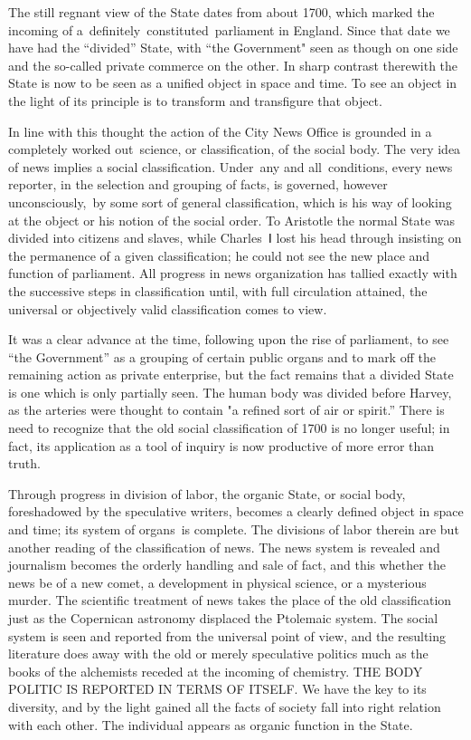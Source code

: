 \documentclass[openany,nobib]{tufte-book}
\begin{document}
The still regnant view of the State dates from about 1700, which marked
the incoming of a~definitely~constituted~parliament in England. Since
that date we have had the ``divided'' State, with ``the Government" seen
as though on one side and the so-called private commerce on the other.
In sharp contrast therewith the State is now to be seen as a unified
object in space and time. To see an object in the light of its principle
is to transform and transfigure that object.~~

In line with this thought the action of the City News Office is grounded
in a completely worked out~science, or classification, of the social
body. The very idea of news implies a social classification. Under~any
and all~conditions, every news reporter, in the selection and grouping
of facts, is governed, however unconsciously,~by some sort of general
classification, which is his way of looking at the object or his notion
of the social order. To Aristotle the normal State was divided into
citizens and slaves, while Charles~Ⅰ lost his head through insisting on
the permanence of a given classification; he could not see the new place
and function of parliament. All progress in news organization has
tallied exactly with the successive steps in classification until, with
full circulation attained, the universal or objectively valid
classification comes to view.~

It was a clear advance at the time, following upon the rise of
parliament, to see ``the Government'' as a grouping of certain public
organs and to mark off the remaining action as private enterprise, but
the fact remains that a divided State is one which is only partially
seen. The human body was divided before Harvey, as the arteries were
thought to contain "a refined sort of air or spirit.'' There is need to
recognize that the old social classification of 1700 is no longer
useful; in fact, its application as a tool of inquiry is now productive
of more error than truth.~

Through progress in division of labor, the organic State, or social
body, foreshadowed by the speculative writers, becomes a clearly defined
object in space and time; its system of organs~is complete. The
divisions of labor therein are but another reading of the classification
of news. The news system is revealed and journalism becomes the orderly
handling and sale of fact, and this whether the news be of a new comet,
a development in physical science, or a mysterious murder. The
scientific treatment of news takes the place of the old classification
just as the Copernican astronomy displaced the Ptolemaic system. The
social system is seen and reported from the universal point of view, and
the resulting literature does away with the old or merely speculative
politics much as the books of the alchemists receded at the incoming of
chemistry. THE BODY POLITIC IS REPORTED IN TERMS OF ITSELF. We have the
key to its diversity, and by the light gained all the facts of society
fall into right relation with each other. The individual appears as
organic function in the State.~
\end{document}
